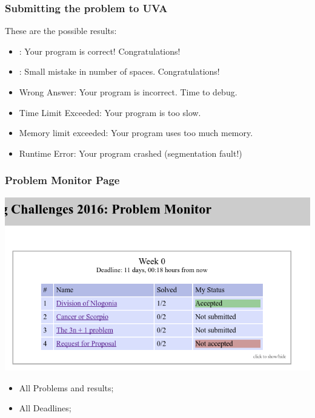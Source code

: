 \documentclass{beamer}
\begin{document}
\begin{frame}
  \frametitle{Submitting the problem to UVA}

  These are the possible results:

  \bigskip

  \begin{itemize}
  \item {}: Your program is correct!
    Congratulations!
  \item {}: Small mistake in number of spaces. Congratulations!

    \bigskip

  \item \alert{Wrong Answer}: Your program is incorrect. Time to debug.

    \bigskip

  \item \alert{Time Limit Exceeded}: Your program is too slow.

  \item \alert{Memory limit exceeded}: Your program uses too much memory.

    \bigskip
  \item \alert{Runtime Error}: Your program crashed (segmentation fault!)

    \bigskip
  \end{itemize}

\end{frame}

\begin{frame}
  \frametitle{Problem Monitor Page}


  \begin{center}
    \includegraphics[width=1\textwidth]{../img/monitorpage2}
  \end{center}

  \begin{itemize}
    \item All Problems and results;
    \item All Deadlines;
  \end{itemize}

\end{frame}
\end{document}
